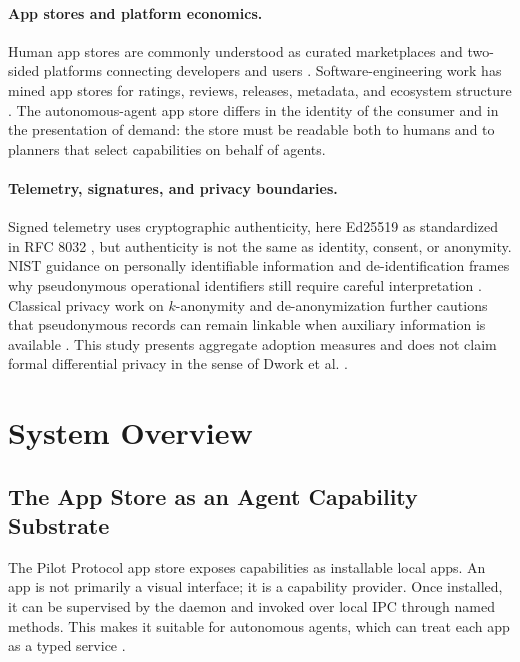\documentclass[10pt,twocolumn]{article}
\newcommand{\pilot}{Pilot Protocol}
\begin{document}
\paragraph{App stores and platform economics.}
Human app stores are commonly understood as curated marketplaces and two-sided platforms connecting developers and users \cite{rochetTirole2003,jansen2013appstores}. Software-engineering work has mined app stores for ratings, reviews, releases, metadata, and ecosystem structure \cite{harman2012appstoremining,martin2017appstoreanalysis,zhu2024appstore}. The autonomous-agent app store differs in the identity of the consumer and in the presentation of demand: the store must be readable both to humans and to planners that select capabilities on behalf of agents.

\paragraph{Telemetry, signatures, and privacy boundaries.}
Signed telemetry uses cryptographic authenticity, here Ed25519 as standardized in RFC 8032 \cite{rfc8032}, but authenticity is not the same as identity, consent, or anonymity. NIST guidance on personally identifiable information and de-identification frames why pseudonymous operational identifiers still require careful interpretation \cite{nist800122,nistir8053}. Classical privacy work on $k$-anonymity and de-anonymization further cautions that pseudonymous records can remain linkable when auxiliary information is available \cite{sweeney2002kanonymity,narayanan2008deanonymization}. This study presents aggregate adoption measures and does not claim formal differential privacy in the sense of Dwork et al. \cite{dwork2006}.

\section{System Overview}
\label{sec:system}

\subsection{The App Store as an Agent Capability Substrate}

The \pilot{} app store exposes capabilities as installable local apps. An app is not primarily a visual interface; it is a capability provider. Once installed, it can be supervised by the daemon and invoked over local IPC through named methods. This makes it suitable for autonomous agents, which can treat each app as a typed service \cite{pilotProtocolSource}.
\end{document}
